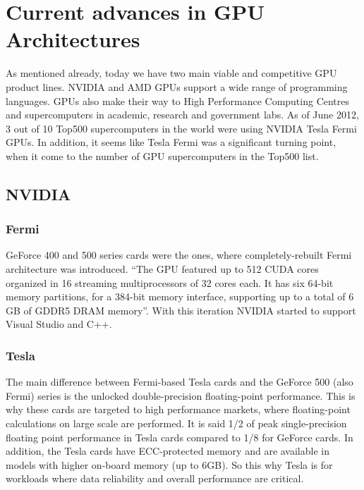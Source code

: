 \section{Current advances in GPU Architectures}
As mentioned already, today we have two main viable and competitive GPU product lines. NVIDIA and AMD GPUs support a wide range of programming languages. GPUs also make their way to High Performance Computing Centres and supercomputers in academic, research and government labs.\cite{nvidia2012super, nvidia2012super2} As of June 2012, 3 out of 10 Top500 supercomputers in the world were using NVIDIA Tesla Fermi GPUs.\cite{top5002012} In addition, it seems like Tesla Fermi was a significant turning point, when it come to the number of GPU supercomputers in the Top500 list.

\subsection{NVIDIA}

\subsubsection{Fermi}
GeForce 400 and 500 series cards were the ones, where completely-rebuilt Fermi architecture was introduced.\cite{nvidia2012fermiwhite} \enquote{The GPU featured up to 512 CUDA cores organized in 16 streaming multiprocessors of 32 cores each. It has six 64-bit memory partitions, for a 384-bit memory interface, supporting up to a total of 6 GB of GDDR5 DRAM
memory}. With this iteration NVIDIA started to support Visual Studio and C++.

\subsubsection{Tesla}
The main difference between Fermi-based Tesla cards and the GeForce 500 (also Fermi) series is the unlocked double-precision floating-point performance. This is why these cards are targeted to high performance markets, where floating-point calculations on large scale are performed. It is said 1/2 of peak single-precision floating point performance in Tesla cards compared to 1/8 for GeForce cards. In addition, the Tesla cards have ECC-protected memory and are available in models with higher on-board memory (up to 6GB). So this why Tesla is for workloads where data reliability and overall performance are critical.

